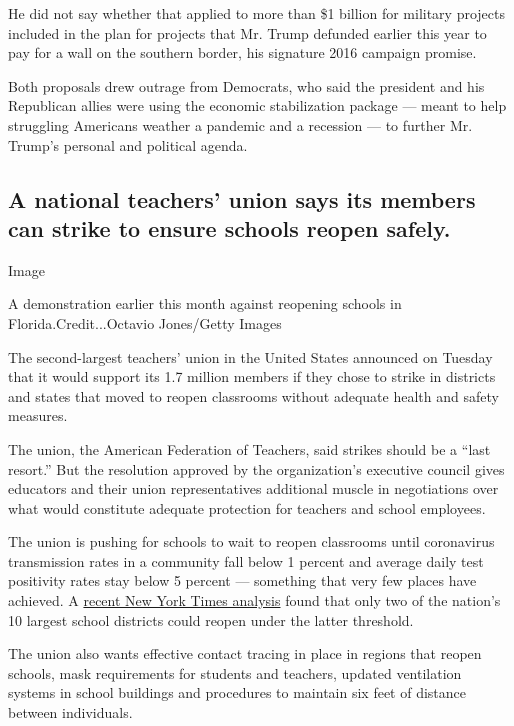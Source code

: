 He did not say whether that applied to more than \$1 billion for
military projects included in the plan for projects that Mr. Trump
defunded earlier this year to pay for a wall on the southern border, his
signature 2016 campaign promise.

Both proposals drew outrage from Democrats, who said the president and
his Republican allies were using the economic stabilization package ---
meant to help struggling Americans weather a pandemic and a recession
--- to further Mr. Trump's personal and political agenda.

\hypertarget{a-national-teachers-union-says-its-members-can-strike-to-ensure-schools-reopen-safely}{%
\subsection{A national teachers' union says its members can strike to
ensure schools reopen
safely.}\label{a-national-teachers-union-says-its-members-can-strike-to-ensure-schools-reopen-safely}}

Image

A demonstration earlier this month against reopening schools in
Florida.Credit...Octavio Jones/Getty Images

The second-largest teachers' union in the United States announced on
Tuesday that it would support its 1.7 million members if they chose to
strike in districts and states that moved to reopen classrooms without
adequate health and safety measures.

The union, the American Federation of Teachers, said strikes should be a
``last resort.'' But the resolution approved by the organization's
executive council gives educators and their union representatives
additional muscle in negotiations over what would constitute adequate
protection for teachers and school employees.

The union is pushing for schools to wait to reopen classrooms until
coronavirus transmission rates in a community fall below 1 percent and
average daily test positivity rates stay below 5 percent --- something
that very few places have achieved. A
\href{https://www.nytimes3xbfgragh.onion/2020/07/14/us/coronavirus-schools-fall.html}{recent
New York Times analysis} found that only two of the nation's 10 largest
school districts could reopen under the latter threshold.

The union also wants effective contact tracing in place in regions that
reopen schools, mask requirements for students and teachers, updated
ventilation systems in school buildings and procedures to maintain six
feet of distance between individuals.

